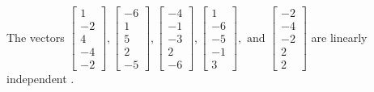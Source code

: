 \begin{exercise}
\begin{exerciseStatement}
  \end{exerciseStatement}
  \begin{exerciseAnswer}
   The vectors \(\left[\begin{array}{r}
1 \\
-2 \\
4 \\
-4 \\
-2
\end{array}\right] , \left[\begin{array}{r}
-6 \\
1 \\
5 \\
2 \\
-5
\end{array}\right] , \left[\begin{array}{r}
-4 \\
-1 \\
-3 \\
2 \\
-6
\end{array}\right] , \left[\begin{array}{r}
1 \\
-6 \\
-5 \\
-1 \\
3
\end{array}\right] , \text{ and } \left[\begin{array}{r}
-2 \\
-4 \\
-2 \\
2 \\
2
\end{array}\right]\) are 
  	 linearly independent  .
  


  \end{exerciseAnswer}
\end{exercise}